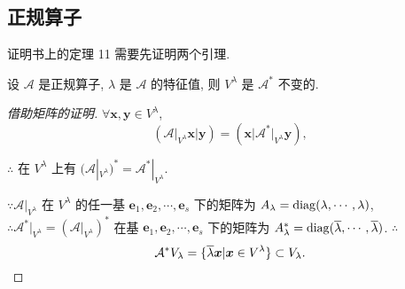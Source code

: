\documentclass{ctexart}
\begin{document}
\subsection{正规算子}
证明书上的定理 11 需要先证明两个引理.
\begin{lemma}\label{l3.2}
    设 $\mathcal{A}$ 是正规算子, $\lambda$ 是 $\mathcal{A}$ 的特征值, 则 $V^\lambda$ 是 $\mathcal{A}^*$ 不变的.
\end{lemma}
\begin{proof}[借助矩阵的证明]
    $\forall\boldsymbol{x},\boldsymbol{y}\in V^\lambda$,
    \[\left(\mathcal{A}|_{V^\lambda}\boldsymbol{x}\Big|\boldsymbol{y}\right)=\left(\boldsymbol{x}\Big|\mathcal{A}^*|_{V^\lambda}\boldsymbol{y}\right),\]

    $\therefore$ 在 $V^\lambda$ 上有 $(\mathcal{A}|_{V^\lambda})^*=\mathcal{A}^*|_{V^\lambda}$.

    $\because\mathcal{A}|_{V^\lambda}$ 在 $V^\lambda$ 的任一基 $\boldsymbol{e}_1,\boldsymbol{e}_2,\cdots,\boldsymbol{e}_s$ 下的矩阵为 $A_\lambda=\operatorname{diag} (\lambda,\cdots,\lambda)$, $\therefore\mathcal{A}^*|_{V^\lambda}=(\mathcal{A}|_{V^\lambda})^*$ 在基 $\boldsymbol{e}_1,\boldsymbol{e}_2,\cdots,\boldsymbol{e}_s$ 下的矩阵为 $A_\lambda^*=\operatorname{diag} (\overline{\lambda},\cdots,\overline{\lambda})$. $\therefore$
    \[\mathcal{A}^*V_\lambda=\{\overline{\lambda}\boldsymbol{x}|\boldsymbol{x}\in V^\lambda\}\subset V_\lambda.\qedhere\]
\end{proof}
\end{document}
